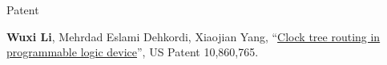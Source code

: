 \begin{rSection}{Patent}

\begin{description}[font=\normalfont]

\item[{[P1]}]{
    \textbf{Wuxi Li}, Mehrdad Eslami Dehkordi, Xiaojian Yang,
    ``\href{https://patents.google.com/patent/US10860765B1/en}{Clock tree routing in programmable logic device}'',
    US Patent 10,860,765.
}

\end{description}

\end{rSection}
